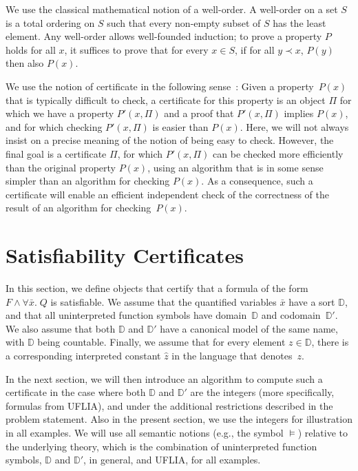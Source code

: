 \documentclass[runningheads]{llncs}
\newcommand{\domain}{\mathbb{D}}
\newcommand{\codomain}{\mathbb{D}'}
\newcommand{\repr}[1]{\hat{#1}}
\begin{document}
We use the classical mathematical notion of a well-order. A well-order on a set $S$ is a total ordering on $S$
such that every non-empty subset of $S$ has the least element. Any well-order allows well-founded induction; to prove
a property $P$ holds for all $x$, it suffices to prove that for every $x\in S$, if for all $y\prec x$, $P(y)$ then also $P(x)$.

We use the notion of certificate in the following sense~\cite{McConnell:11}: Given a property~$P(x)$ that is typically difficult to check, a certificate for this property is an object $\Pi$ for which we have a property $P'(x,\Pi)$ and a proof that $P'(x,\Pi)$ implies $P(x)$, and for which checking $P'(x,\Pi)$ is easier than $P(x)$. Here, we will not always insist on a precise meaning of the notion of being easy to check. However, the final goal is a certificate $\Pi$, for which $P'(x,\Pi)$ can be checked more efficiently than the original property $P(x)$, using an algorithm that is in some sense simpler than an algorithm for checking $P(x)$. As a consequence, such a certificate will enable an efficient independent check of the correctness of the result of an algorithm for checking~$P(x)$.

\section{Satisfiability Certificates}
\label{sec:certificate}

In this section, we define objects that certify that a formula of the form $F \land \forall \bar{x}.\; Q$ is satisfiable. We assume that the quantified variables $\bar{x}$ have a sort $\domain$, and that all uninterpreted function symbols have domain~$\domain$ and codomain~$\codomain$. We also assume that both $\domain$ and $\codomain$ have a canonical model of the same name, with $\domain$ being countable.
Finally, we assume that for every element $z\in\domain$, there is a corresponding interpreted constant $\repr{z}$ in the language that denotes~$z$.

In the next section, we will then introduce an algorithm to compute such a certificate in the case where both $\domain$ and $\codomain$ are the integers (more specifically, formulas from UFLIA), and under the additional restrictions described in the problem statement. Also in the present section, we use the integers for illustration in all examples. We will use all semantic notions (e.g., the symbol $\models$) relative to the underlying theory, which is the combination of uninterpreted function symbols, $\domain$ and $\codomain$, in general, and UFLIA, for all examples.
\end{document}
